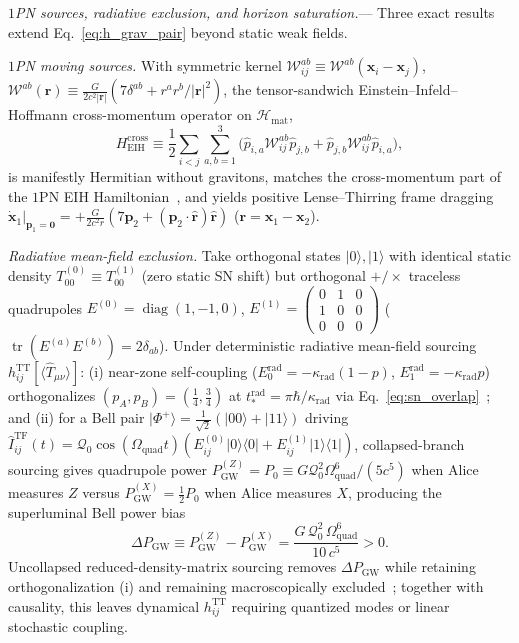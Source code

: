 \documentclass[aps,prl,reprint,superscriptaddress,nofootinbib,floatfix]{revtex4-2}
\theoremstyle{prlthm}
\newcommand{\prlsec}[1]{\par\smallskip\noindent\emph{#1.}---}
\begin{document}
\prlsec{$1$PN sources, radiative exclusion, and horizon saturation}
Three exact results extend Eq.~\eqref{eq:h_grav_pair} beyond static weak fields.

\emph{$1$PN moving sources.} With symmetric kernel $\mathcal{W}_{ij}^{ab}\equiv\mathcal{W}^{ab}(\mathbf{x}_i-\mathbf{x}_j)$, $\mathcal{W}^{ab}(\mathbf{r})\equiv\frac{G}{2c^2|\mathbf{r}|}(7\delta^{ab}+r^ar^b/|\mathbf{r}|^2)$, the tensor-sandwich Einstein--Infeld--Hoffmann cross-momentum operator on $\mathcal{H}_\text{mat}$,
\begin{equation}
  H_\text{EIH}^\text{cross}\equiv\frac{1}{2}\sum_{i<j}\sum_{a,b=1}^3\big(\hat{p}_{i,a}\mathcal{W}_{ij}^{ab}\hat{p}_{j,b}+\hat{p}_{j,b}\mathcal{W}_{ij}^{ab}\hat{p}_{i,a}\big),
  \label{eq:eih_1pn}
\end{equation}
is manifestly Hermitian without gravitons, matches the cross-momentum part of the $1$PN EIH Hamiltonian~\citep{LandauLifshitz1975Classical}, and yields positive Lense--Thirring frame dragging $\dot{\mathbf{x}}_1|_{\mathbf{p}_1=\mathbf{0}}=+\frac{G}{2c^2r}(7\mathbf{p}_2+(\mathbf{p}_2\cdot\hat{\mathbf{r}})\hat{\mathbf{r}})$ ($\mathbf{r}=\mathbf{x}_1-\mathbf{x}_2$).

\emph{Radiative mean-field exclusion.} Take orthogonal states $|0\rangle,|1\rangle$ with identical static density $T_{00}^{(0)}\equiv T_{00}^{(1)}$ (zero static SN shift) but orthogonal $+/\times$ traceless quadrupoles $E^{(0)}=\operatorname{diag}(1,-1,0)$, $E^{(1)}=(\begin{smallmatrix}0&1&0\\1&0&0\\0&0&0\end{smallmatrix})$ ($\operatorname{tr}(E^{(a)}E^{(b)})=2\delta_{ab}$). Under deterministic radiative mean-field sourcing $h_{ij}^\text{TT}[\langle\hat{T}_{\mu\nu}\rangle]$: (i) near-zone self-coupling ($E_0^\text{rad}=-\kappa_\text{rad}(1-p)$, $E_1^\text{rad}=-\kappa_\text{rad}p$) orthogonalizes $(p_A,p_B)=(\tfrac{1}{4},\tfrac{3}{4})$ at $t_*^\text{rad}=\pi\hbar/\kappa_\text{rad}$ via Eq.~\eqref{eq:sn_overlap}~\citep{Polchinski1991}; and (ii) for a Bell pair $|\Phi^+\rangle=\tfrac{1}{\sqrt{2}}(|00\rangle+|11\rangle)$ driving $\hat{I}_{ij}^\text{TF}(t)=\mathcal{Q}_0\cos(\Omega_\text{quad}t)(E_{ij}^{(0)}|0\rangle\langle 0|+E_{ij}^{(1)}|1\rangle\langle 1|)$, collapsed-branch sourcing gives quadrupole power $P_\text{GW}^{(Z)}=P_0\equiv G\mathcal{Q}_0^2\Omega_\text{quad}^6/(5c^5)$ when Alice measures $Z$ versus $P_\text{GW}^{(X)}=\tfrac{1}{2}P_0$ when Alice measures $X$, producing the superluminal Bell power bias
\begin{equation}
  \Delta P_\text{GW}\equiv P_\text{GW}^{(Z)}-P_\text{GW}^{(X)}=\frac{G\,\mathcal{Q}_0^2\,\Omega_\text{quad}^6}{10\,c^5}>0.
  \label{eq:gw_power_bias}
\end{equation}
Uncollapsed reduced-density-matrix sourcing removes $\Delta P_\text{GW}$ while retaining orthogonalization (i) and remaining macroscopically excluded~\citep{PageGeilker1981Indirect}; together with causality, this leaves dynamical $h_{ij}^\text{TT}$ requiring quantized modes or linear stochastic coupling.
\end{document}

